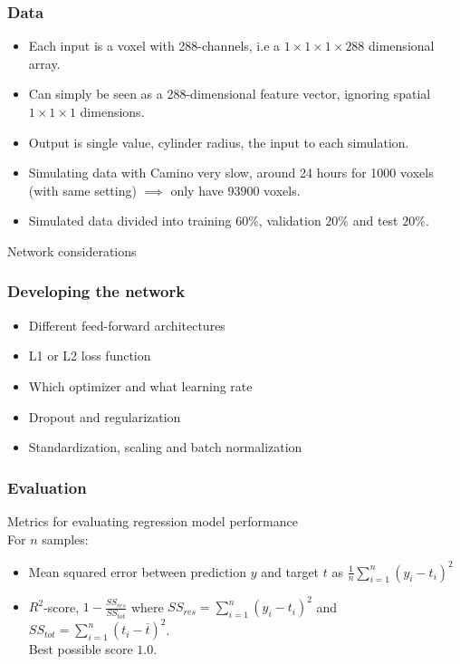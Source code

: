 \documentclass{beamer}
\begin{document}
\begin{frame}
\frametitle{Data}
\begin{itemize}
\item<1-> Each input is a voxel with 288-channels, i.e a $1 \times 1 \times 1 \times 288$ dimensional array.
\item<2-> Can simply be seen as a 288-dimensional feature vector, ignoring spatial $1 \times 1 \times 1$ dimensions.
\item<3-> Output is single value, cylinder radius, the input to each simulation.
\item<4-> Simulating data with Camino very slow, around 24 hours for 1000 voxels (with same setting) $\implies$ only have $93 900$ voxels.
\item<5-> Simulated data divided into training $60\%$, validation $20\%$ and test $20\%$.
\end{itemize}

\end{frame}

\begin{frame}
Network considerations
\frametitle{Developing the network}
\begin{itemize}
\item<2-> Different feed-forward architectures
\item<3-> L1 or L2 loss function
\item<4-> Which optimizer and what learning rate
\item<5-> Dropout and regularization
\item<6-> Standardization, scaling and batch normalization
\end{itemize}
\end{frame}

\begin{frame}
\frametitle{Evaluation}
Metrics for evaluating regression model performance \\
\pause
For $n$ samples:
\begin{itemize}
\item<2->Mean squared error between prediction $y$ and target $t$ as $\frac{1}{n} \sum_{i=1}^n (y_i-t_i)^2$
\item<3->$R^2$-score, $1 - \frac{SS_{res}}{SS_{tot}}$ where $SS_{res} = \sum_{i=1}^n(y_i - t_i)^2$ and $SS_{tot} = \sum_{i=1}^n(t_i - \overline{t})^2$. \\ Best possible score $1.0$.
\end{itemize}
\end{frame}
\end{document}
